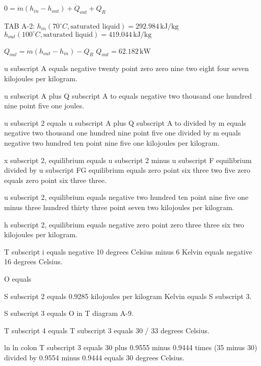 \( 0 = \dot{m} (h_{in} - h_{out}) + \dot{Q}_{out} + Q_R \)  

TAB A-2:  
\( h_{in} (70^\circ C, \text{saturated liquid}) = 292.984 \, \text{kJ/kg} \)  
\( h_{out} (100^\circ C, \text{saturated liquid}) = 419.044 \, \text{kJ/kg} \)  

\( Q_{out} = \dot{m} (h_{out} - h_{in}) - Q_R \)  
\( Q_{out} = 62.182 \, \text{kW} \)

u subscript A equals negative twenty point zero zero nine two eight four seven kilojoules per kilogram.  

u subscript A plus Q subscript A to equals negative two thousand one hundred nine point five one joules.  

u subscript 2 equals u subscript A plus Q subscript A to divided by m equals negative two thousand one hundred nine point five one divided by m equals negative two hundred ten point nine five one kilojoules per kilogram.  

x subscript 2, equilibrium equals u subscript 2 minus u subscript F equilibrium divided by u subscript FG equilibrium equals zero point six three two five zero equals zero point six three three.  

u subscript 2, equilibrium equals negative two hundred ten point nine five one minus three hundred thirty three point seven two kilojoules per kilogram.  

h subscript 2, equilibrium equals negative zero point zero three three six two kilojoules per kilogram.

T subscript i equals negative 10 degrees Celsius minus 6 Kelvin equals negative 16 degrees Celsius.  

O equals  

S subscript 2 equals 0.9285 kilojoules per kilogram Kelvin equals S subscript 3.  

S subscript 3 equals O in T diagram A-9.  

T subscript 4 equals T subscript 3 equals 30 / 33 degrees Celsius.  

ln ln colon T subscript 3 equals 30 plus 0.9555 minus 0.9444 times (35 minus 30) divided by 0.9554 minus 0.9444 equals 30 degrees Celsius.